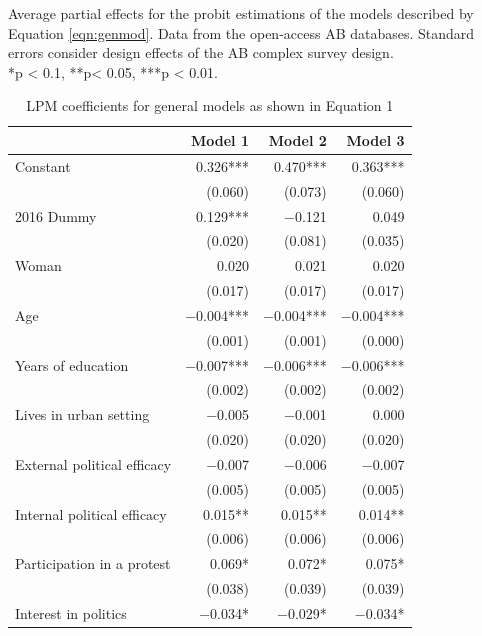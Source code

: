 \documentclass[floatsintext,man]{apa7}\usepackage[]{graphicx}\usepackage[]{color}
\begin{document}
\begin{table}[htbp]
\begin{center}
\end{center}
Average partial effects for the probit estimations of the models described by Equation \ref{eqn:genmod}. Data from the open-access AB databases. Standard errors consider design effects of the AB complex survey design.\\
*p < 0.1, **p< 0.05, ***p < 0.01.
\end{table}
\clearpage

\begin{longtable}[t]{lrrr}
\caption{\label{tab:complexmodlpm}LPM coefficients for general models as shown in Equation 1}\\
\toprule
  & Model 1 & Model 2 & Model 3\\
\midrule
Constant & \num{0.326}*** & \num{0.470}*** & \num{0.363}***\\
 & (\num{0.060}) & (\num{0.073}) & (\num{0.060})\\
2016 Dummy & \num{0.129}*** & \num{-0.121} & \num{0.049}\\
 & (\num{0.020}) & (\num{0.081}) & (\num{0.035})\\
Woman & \num{0.020} & \num{0.021} & \num{0.020}\\
 & (\num{0.017}) & (\num{0.017}) & (\num{0.017})\\
Age & \num{-0.004}*** & \num{-0.004}*** & \num{-0.004}***\\
 & (\num{0.001}) & (\num{0.001}) & (\num{0.000})\\
Years of education & \num{-0.007}*** & \num{-0.006}*** & \num{-0.006}***\\
 & (\num{0.002}) & (\num{0.002}) & (\num{0.002})\\
Lives in urban setting & \num{-0.005} & \num{-0.001} & \num{0.000}\\
 & (\num{0.020}) & (\num{0.020}) & (\num{0.020})\\
External political efficacy & \num{-0.007} & \num{-0.006} & \num{-0.007}\\
 & (\num{0.005}) & (\num{0.005}) & (\num{0.005})\\
Internal political efficacy & \num{0.015}** & \num{0.015}** & \num{0.014}**\\
 & (\num{0.006}) & (\num{0.006}) & (\num{0.006})\\
Participation in a protest & \num{0.069}* & \num{0.072}* & \num{0.075}*\\
 & (\num{0.038}) & (\num{0.039}) & (\num{0.039})\\
Interest in politics & \num{-0.034}* & \num{-0.029}* & \num{-0.034}*\\

\end{longtable}
\end{document}
